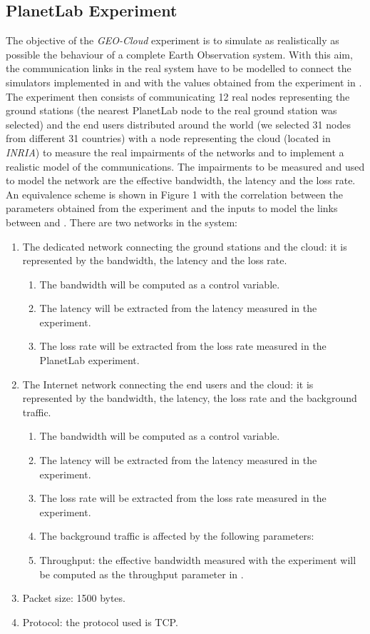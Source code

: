 \subsection{PlanetLab Experiment}

The objective of the \emph{GEO-Cloud} experiment is to simulate as realistically as possible the behaviour of a complete Earth Observation system. With this aim, the communication links in the real system have to be modelled to connect the simulators implemented in \vw and \bonfire with the values obtained from the experiment in \pl. The experiment then consists of communicating 12 real nodes representing the ground stations (the nearest PlanetLab node to the real ground station was selected) and the end users distributed around the world (we selected 31 nodes from different 31 countries) with a node representing the cloud (located in \emph{INRIA}) to measure the real impairments of the networks and to implement a realistic model of the communications. The impairments to be measured and used to model the network are the effective bandwidth, the latency and the loss rate.
An equivalence scheme is shown in Figure 1 with the correlation between the
parameters obtained from the experiment and the inputs to model the links
between \vw and \bonfire.  There are two networks in the system: 
\begin{enumerate}
\item The dedicated network connecting the ground stations and the cloud: it
  is represented by the bandwidth, the latency and the loss rate. 
\begin{enumerate}
\item The bandwidth will be computed as a control variable.
\item The latency will be extracted from the latency measured in the \pl experiment.
\item The loss rate will be extracted from the loss rate measured in the PlanetLab experiment.
 \end{enumerate}
\item	The Internet network connecting the end users and the cloud: it is
  represented by the bandwidth, the latency, the loss rate and the background
  traffic.
\begin{enumerate}
\item The bandwidth will be computed as a control variable.
\item The latency will be extracted from the latency measured in the \pl experiment.
\item The loss rate will be extracted from the loss rate measured in the \pl experiment.
\item The background traffic is affected by the following parameters:
\item Throughput: the effective bandwidth measured with the \pl
experiment will be computed as the throughput parameter in \vw.
\end{enumerate}

\item Packet size: 1500 bytes.
\item Protocol: the protocol used is TCP.
\end{enumerate}

